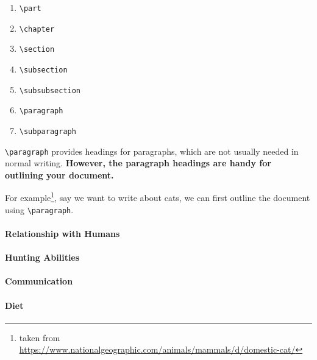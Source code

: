 \documentclass[a4paper,12pt]{article}
\begin{document}
\begin{enumerate}
    \item \verb|\part|
    \item \verb|\chapter|
    \item \verb|\section|
    \item \verb|\subsection|
    \item \verb|\subsubsection|
    \item \verb|\paragraph|
    \item \verb|\subparagraph|
\end{enumerate}

\verb|\paragraph| provides headings for paragraphs, which are not usually needed in normal writing. \textbf{However, the paragraph headings are handy for outlining your document.}

For example\footnote{taken from \url{https://www.nationalgeographic.com/animals/mammals/d/domestic-cat/}}, say we want to write about cats, we can first outline the document using \verb|\paragraph|.

\begin{tcolorbox}[parbox=false]
    \paragraph{Relationship with Humans}
    \paragraph{Hunting Abilities}
    \paragraph{Communication}
    \paragraph{Diet}
\end{tcolorbox}
\end{document}
